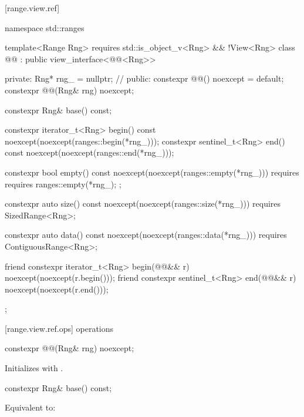 {\color{newclr}
[range.view.ref]{}

\begin{codeblock}
namespace std::ranges {
  template<Range Rng>
    requires std::is_object_v<Rng> && !View<Rng>
  class @@ : public view_interface<@@<Rng>> {
  private:
    Rng* rng_ = nullptr; // \expos
  public:
    constexpr @@() noexcept = default;
    constexpr @@(Rng& rng) noexcept;

    constexpr Rng& base() const;

    constexpr iterator_t<Rng> begin() const
      noexcept(noexcept(ranges::begin(*rng_)));
    constexpr sentinel_t<Rng> end() const
      noexcept(noexcept(ranges::end(*rng_)));

    constexpr bool empty() const
      noexcept(noexcept(ranges::empty(*rng_)))
      requires requires { ranges::empty(*rng_); };

    constexpr auto size() const
      noexcept(noexcept(ranges::size(*rng_)))
      requires SizedRange<Rng>;

    constexpr auto data() const
      noexcept(noexcept(ranges::data(*rng_)))
      requires ContiguousRange<Rng>;

    friend constexpr iterator_t<Rng> begin(@@&& r)
      noexcept(noexcept(r.begin()));
    friend constexpr sentinel_t<Rng> end(@@&& r)
      noexcept(noexcept(r.end()));
  };
}
\end{codeblock}

[range.view.ref.ops]{ operations}

%
\begin{itemdecl}
constexpr @@(Rng& rng) noexcept;
\end{itemdecl}

\begin{itemdescr}
\pnum
\effects Initializes  with .
\end{itemdescr}

%
\begin{itemdecl}
constexpr Rng& base() const;
\end{itemdecl}

\begin{itemdescr}
\pnum
\effects Equivalent to: 
\end{itemdescr}

}
